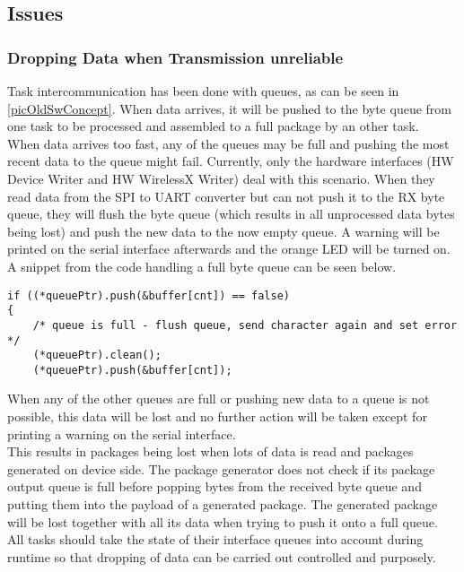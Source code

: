 \subsection{Issues}
%
\subsubsection{Dropping Data when Transmission unreliable}
Task intercommunication has been done with queues, as can be seen in \autoref{picOldSwConcept}. When data arrives, it will be pushed to the byte queue from one task to be processed and assembled to a full package by an other task. \\
When data arrives too fast, any of the queues may be full and pushing the most recent data to the queue might fail. Currently, only the hardware interfaces (HW Device Writer and HW WirelessX Writer) deal with this scenario. When they read data from the SPI to UART converter but can not push it to the RX byte queue, they will flush the byte queue (which results in all unprocessed data bytes being lost) and push the new data to the now empty queue. A warning will be printed on the serial interface afterwards and the orange LED will be turned on. \\
A snippet from the code handling a full byte queue can be seen below.\\
\begin{lstlisting}
if ((*queuePtr).push(&buffer[cnt]) == false)
{
    /* queue is full - flush queue, send character again and set error */
    (*queuePtr).clean();
    (*queuePtr).push(&buffer[cnt]);
\end{lstlisting}
When any of the other queues are full or pushing new data to a queue is not possible, this data will be lost and no further action will be taken except for printing a warning on the serial interface.\\
This results in packages being lost when lots of data is read and packages generated on device side. The package generator does not check if its package output queue is full before popping bytes from the received byte queue and putting them into the payload of a generated package. The generated package will be lost together with all its data when trying to push it onto a full queue. \\
All tasks should take the state of their interface queues into account during runtime so that dropping of data can be carried out controlled and purposely.\\
%

